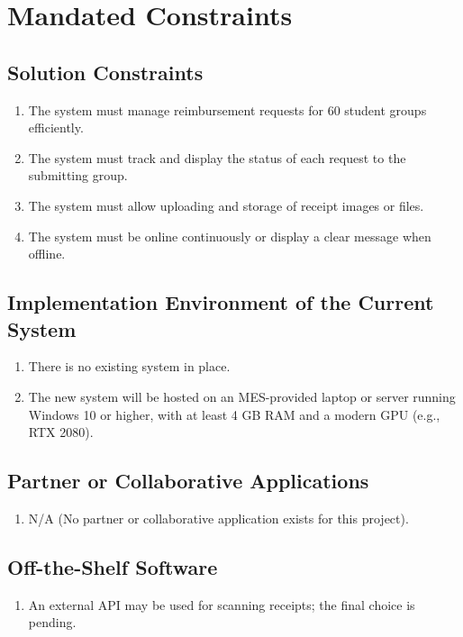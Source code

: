 \documentclass[12pt]{article}
\begin{document}
\section{Mandated Constraints}
\subsection{Solution Constraints}
\begin{enumerate}
  \item The system must manage reimbursement requests for 60 student groups efficiently.
  \item The system must track and display the status of each request to the submitting group.
  \item The system must allow uploading and storage of receipt images or files.
  \item The system must be online continuously or display a clear message when offline.
\end{enumerate}

\subsection{Implementation Environment of the Current System}
\begin{enumerate}
  \item There is no existing system in place.
  \item The new system will be hosted on an MES-provided laptop or server running Windows 10 or higher, with at least 4 GB RAM and a modern GPU (e.g., RTX 2080).
\end{enumerate}

\subsection{Partner or Collaborative Applications}
\begin{enumerate}
  \item N/A (No partner or collaborative application exists for this project).
\end{enumerate}

\subsection{Off-the-Shelf Software}
\begin{enumerate}
  \item An external API may be used for scanning receipts; the final choice is pending.
\end{enumerate}
\end{document}
